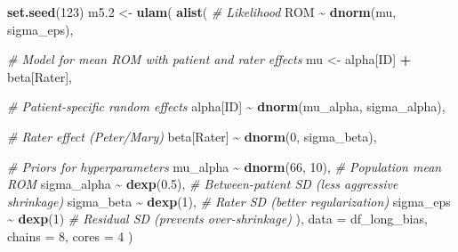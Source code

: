 \documentclass[
]{book}
\newenvironment{Shaded}{\begin{snugshade}}{\end{snugshade}}
\newcommand{\AttributeTok}[1]{\textcolor[rgb]{0.13,0.29,0.53}{#1}}
\newcommand{\CommentTok}[1]{\textcolor[rgb]{0.56,0.35,0.01}{\textit{#1}}}
\newcommand{\DecValTok}[1]{\textcolor[rgb]{0.00,0.00,0.81}{#1}}
\newcommand{\FloatTok}[1]{\textcolor[rgb]{0.00,0.00,0.81}{#1}}
\newcommand{\FunctionTok}[1]{\textcolor[rgb]{0.13,0.29,0.53}{\textbf{#1}}}
\newcommand{\NormalTok}[1]{#1}
\newcommand{\OtherTok}[1]{\textcolor[rgb]{0.56,0.35,0.01}{#1}}
\newcommand{\SpecialCharTok}[1]{\textcolor[rgb]{0.81,0.36,0.00}{\textbf{#1}}}
\begin{document}
\begin{Shaded}
\begin{Highlighting}[]
\FunctionTok{set.seed}\NormalTok{(}\DecValTok{123}\NormalTok{)}
\NormalTok{m5}\FloatTok{.2} \OtherTok{\textless{}{-}} \FunctionTok{ulam}\NormalTok{(}
  \FunctionTok{alist}\NormalTok{(}
    \CommentTok{\# Likelihood}
\NormalTok{    ROM }\SpecialCharTok{\textasciitilde{}} \FunctionTok{dnorm}\NormalTok{(mu, sigma\_eps),}
    
    \CommentTok{\# Model for mean ROM with patient and rater effects}
\NormalTok{    mu }\OtherTok{\textless{}{-}}\NormalTok{ alpha[ID] }\SpecialCharTok{+}\NormalTok{ beta[Rater],}
    
    \CommentTok{\# Patient{-}specific random effects}
\NormalTok{    alpha[ID] }\SpecialCharTok{\textasciitilde{}} \FunctionTok{dnorm}\NormalTok{(mu\_alpha, sigma\_alpha),}
    
    \CommentTok{\# Rater effect (Peter/Mary)}
\NormalTok{    beta[Rater] }\SpecialCharTok{\textasciitilde{}} \FunctionTok{dnorm}\NormalTok{(}\DecValTok{0}\NormalTok{, sigma\_beta),}
    
    \CommentTok{\# Priors for hyperparameters}
\NormalTok{    mu\_alpha }\SpecialCharTok{\textasciitilde{}} \FunctionTok{dnorm}\NormalTok{(}\DecValTok{66}\NormalTok{, }\DecValTok{10}\NormalTok{),  }\CommentTok{\# Population mean ROM}
\NormalTok{    sigma\_alpha }\SpecialCharTok{\textasciitilde{}} \FunctionTok{dexp}\NormalTok{(}\FloatTok{0.5}\NormalTok{),  }\CommentTok{\# Between{-}patient SD (less aggressive shrinkage)}
\NormalTok{    sigma\_beta }\SpecialCharTok{\textasciitilde{}} \FunctionTok{dexp}\NormalTok{(}\DecValTok{1}\NormalTok{),   }\CommentTok{\# Rater SD (better regularization)}
\NormalTok{    sigma\_eps }\SpecialCharTok{\textasciitilde{}} \FunctionTok{dexp}\NormalTok{(}\DecValTok{1}\NormalTok{)     }\CommentTok{\# Residual SD (prevents over{-}shrinkage)}
\NormalTok{  ), }
  \AttributeTok{data =}\NormalTok{ df\_long\_bias, }
  \AttributeTok{chains =} \DecValTok{8}\NormalTok{, }\AttributeTok{cores =} \DecValTok{4}
\NormalTok{)}
\end{Highlighting}
\end{Shaded}
\end{document}
